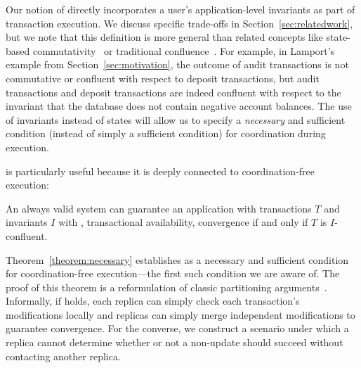  Our notion of \iconfluence
directly incorporates a user's application-level invariants as part of
transaction execution. We discuss specific trade-offs in
Section~\ref{sec:relatedwork}, but we note that this definition is
more general than related concepts like state-based
commutativity~\cite{weihl-thesis} or traditional
confluence~\cite{calm,termrewriting}. For example, in Lamport's
example from Section~\ref{sec:motivation}, the outcome of audit
transactions is not commutative or confluent with respect to deposit
transactions, but audit transactions and deposit transactions are
indeed confluent with respect to the invariant that the database does
not contain negative account balances. The use of invariants instead
of states will allow us to specify a \textit{necessary} and sufficient
condition (instead of simply a sufficient condition) for coordination
during execution.

\iconfluence is particularly useful because it is deeply connected to
coordination-free execution:

\begin{theorem}
\label{theorem:necessary}
An always valid system can guarantee an application with transactions
$T$ and invariants $I$ with \cfreedom, transactional availability,
convergence if and only if $T$ is $I$-confluent.
\end{theorem}

Theorem~\ref{theorem:necessary} establishes \iconfluence as a
necessary and sufficient condition for coordination-free
execution---the first such condition we are aware of. The proof of
this theorem is a reformulation of classic partitioning
arguments~\cite{gilbert-cap}. Informally, if \iconfluence holds, each
replica can simply check each transaction's modifications locally and
replicas can simply merge independent modifications to guarantee
convergence. For the converse, we construct a scenario under which a
replica cannot determine whether or not a non-\iconfluent update
should succeed without contacting another replica.

